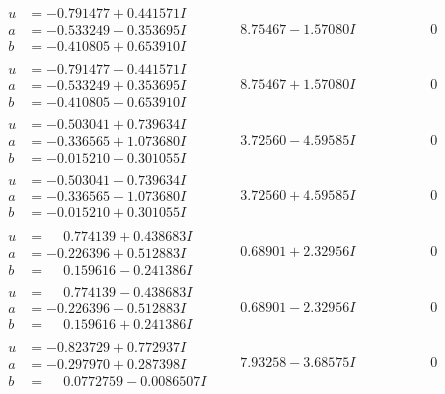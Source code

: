 \documentclass[1p]{elsarticle_modified}
\theoremstyle{definition}
\begin{document}
$$\begin{array}{c|c|c}
\begin{aligned}
u &= -0.791477 + 0.441571 I \\
a &= -0.533249 - 0.353695 I \\
b &= -0.410805 + 0.653910 I\end{aligned}
 & \phantom{-}8.75467 - 1.57080 I & \phantom{-0.000000 } 0 \\ \hline\begin{aligned}
u &= -0.791477 - 0.441571 I \\
a &= -0.533249 + 0.353695 I \\
b &= -0.410805 - 0.653910 I\end{aligned}
 & \phantom{-}8.75467 + 1.57080 I & \phantom{-0.000000 } 0 \\ \hline\begin{aligned}
u &= -0.503041 + 0.739634 I \\
a &= -0.336565 + 1.073680 I \\
b &= -0.015210 - 0.301055 I\end{aligned}
 & \phantom{-}3.72560 - 4.59585 I & \phantom{-0.000000 } 0 \\ \hline\begin{aligned}
u &= -0.503041 - 0.739634 I \\
a &= -0.336565 - 1.073680 I \\
b &= -0.015210 + 0.301055 I\end{aligned}
 & \phantom{-}3.72560 + 4.59585 I & \phantom{-0.000000 } 0 \\ \hline\begin{aligned}
u &= \phantom{-}0.774139 + 0.438683 I \\
a &= -0.226396 + 0.512883 I \\
b &= \phantom{-}0.159616 - 0.241386 I\end{aligned}
 & \phantom{-}0.68901 + 2.32956 I & \phantom{-0.000000 } 0 \\ \hline\begin{aligned}
u &= \phantom{-}0.774139 - 0.438683 I \\
a &= -0.226396 - 0.512883 I \\
b &= \phantom{-}0.159616 + 0.241386 I\end{aligned}
 & \phantom{-}0.68901 - 2.32956 I & \phantom{-0.000000 } 0 \\ \hline\begin{aligned}
u &= -0.823729 + 0.772937 I \\
a &= -0.297970 + 0.287398 I \\
b &= \phantom{-}0.0772759 - 0.0086507 I\end{aligned}
 & \phantom{-}7.93258 - 3.68575 I & \phantom{-0.000000 } 0 \\ \hline\begin{aligned}

\end{aligned}
\end{array}$$
\end{document}
